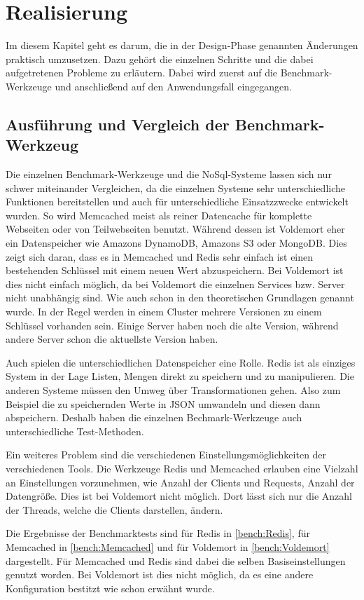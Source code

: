 \chapter{Realisierung}
Im diesem Kapitel geht es darum, die in der Design-Phase genannten Änderungen
praktisch umzusetzen. Dazu gehört die einzelnen Schritte und die dabei
aufgetretenen Probleme zu erläutern. Dabei wird zuerst auf die
Benchmark-Werkzeuge und anschließend auf den Anwendungsfall eingegangen.

\section{Ausführung und Vergleich der Benchmark-Werkzeug}
Die einzelnen Benchmark-Werkzeuge und die NoSql-Systeme lassen sich nur schwer
miteinander Vergleichen, da die einzelnen Systeme sehr unterschiedliche
Funktionen bereitstellen und auch für unterschiedliche Einsatzzwecke entwickelt
wurden. So wird Memcached meist als reiner Datencache für komplette Webseiten
oder von Teilwebseiten benutzt. Während dessen ist Voldemort eher ein
Datenspeicher wie Amazons DynamoDB, Amazons S3 oder MongoDB. Dies zeigt sich
daran, dass es in Memcached und Redis sehr einfach ist einen bestehenden
Schlüssel mit einem neuen Wert abzuspeichern. Bei Voldemort ist dies nicht
einfach möglich, da bei Voldemort die einzelnen Services bzw. Server nicht
unabhängig sind. Wie auch schon in den theoretischen Grundlagen genannt wurde.
In der Regel werden in einem Cluster mehrere Versionen zu einem Schlüssel
vorhanden sein. Einige Server haben noch die alte Version, während andere Server
schon die aktuellste Version haben.

Auch spielen die unterschiedlichen Datenspeicher eine Rolle. Redis ist als
einziges System in der Lage Listen, Mengen direkt zu speichern und zu
manipulieren. Die anderen Systeme müssen den Umweg über Transformationen gehen.
Also zum Beispiel die zu speichernden Werte in JSON umwandeln und diesen dann
abspeichern. Deshalb haben die einzelnen Bechmark-Werkzeuge auch unterschiedliche
Test-Methoden.

Ein weiteres Problem sind die verschiedenen Einstellungsmöglichkeiten der
verschiedenen Tools. Die Werkzeuge Redis und Memcached erlauben eine Vielzahl
an Einstellungen vorzunehmen, wie Anzahl der Clients und Requests, Anzahl der
Datengröße. Dies ist bei Voldemort nicht möglich. Dort lässt sich nur die Anzahl
der Threads, welche die Clients darstellen, ändern. 

Die Ergebnisse der Benchmarktests sind für Redis in \ref{bench:Redis}, für
Memcached in \ref{bench:Memcached} und für Voldemort in \ref{bench:Voldemort}
dargestellt. Für Memcached und Redis sind dabei die selben Basiseinstellungen
genutzt worden. Bei Voldemort ist dies nicht möglich, da es eine andere
Konfiguration bestitzt wie schon erwähnt wurde. 

